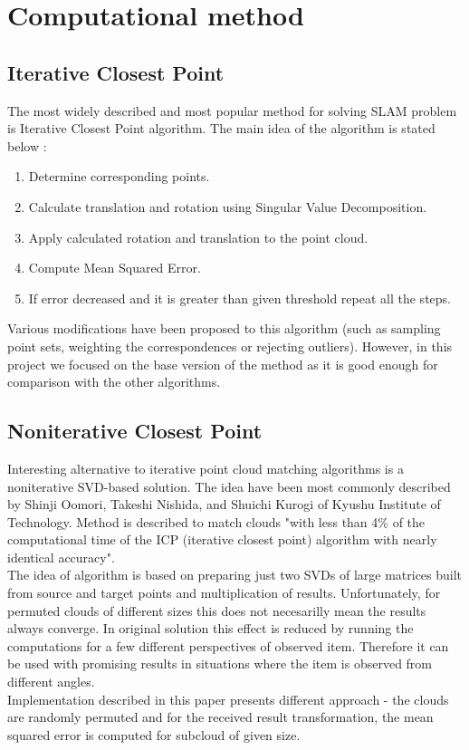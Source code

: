 \documentclass[titlepage]{article}
\begin{document}
\section{Computational method}

\subsection{Iterative Closest Point}
The most widely described and most popular method for solving SLAM problem is Iterative Closest Point algorithm. The main idea of the algorithm is stated below \cite{ms-pres1}:
\begin{enumerate}
\item Determine corresponding points.
\item Calculate translation and rotation using Singular Value Decomposition.
\item Apply calculated rotation and translation to the point cloud.
\item Compute Mean Squared Error.
\item If error decreased and it is greater than given threshold repeat all the steps.
\end{enumerate}

Various modifications have been proposed to this algorithm (such as sampling point sets, weighting the correspondences or rejecting outliers). However, in this project we focused on the base version of the method as it is good enough for comparison with the other algorithms.

\subsection{Noniterative Closest Point}
Interesting alternative to iterative point cloud matching algorithms is a noniterative SVD-based solution. The idea have been most commonly described by Shinji Oomori, Takeshi Nishida, and Shuichi Kurogi of Kyushu Institute of Technology. Method is described to match clouds "with less than 4\% of the computational
time of the ICP (iterative closest point) algorithm with nearly identical accuracy".\\
The idea of algorithm is based on preparing just two SVDs of large matrices built from source and target points and multiplication of results. Unfortunately, for permuted clouds of different sizes this does not necesarilly mean the results always converge. In original solution this effect is reduced by running the computations for a few different perspectives of observed item. Therefore it can be used with promising results in situations where the item is observed from different angles.\\
Implementation described in this paper presents different approach - the clouds are randomly permuted and for the received result transformation, the mean squared error is computed for subcloud of given size.
\end{document}
